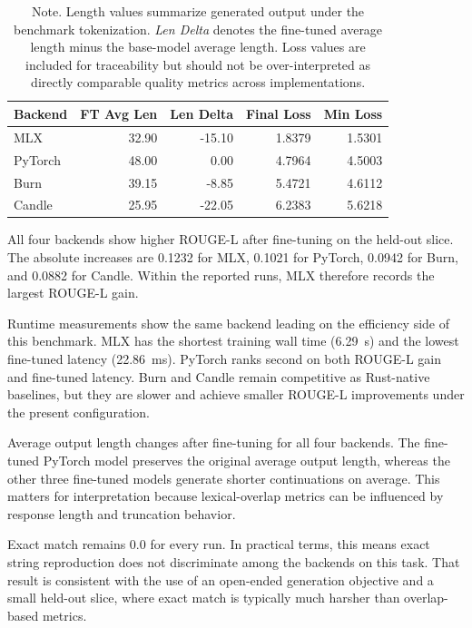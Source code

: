 \documentclass[11pt]{article}
\begin{document}
\begin{table}[t]
\centering
\small
\begin{tabular}{lrrrr}
\toprule
Backend & FT Avg Len & Len Delta & Final Loss & Min Loss \\
\midrule
MLX      & 32.90 & -15.10 & 1.8379 & 1.5301 \\
PyTorch  & 48.00 &   0.00 & 4.7964 & 4.5003 \\
Burn     & 39.15 &  -8.85 & 5.4721 & 4.6112 \\
Candle   & 25.95 & -22.05 & 6.2383 & 5.6218 \\
\bottomrule
\end{tabular}
\caption{Response-length effects and training-loss summaries.}
\label{tab:length-loss}
\caption*{\footnotesize Note. Length values summarize generated output under the benchmark tokenization. \textit{Len Delta} denotes the fine-tuned average length minus the base-model average length. Loss values are included for traceability but should not be over-interpreted as directly comparable quality metrics across implementations.}
\end{table}

All four backends show higher ROUGE-L after fine-tuning on the held-out slice. The absolute increases are 0.1232 for MLX, 0.1021 for PyTorch, 0.0942 for Burn, and 0.0882 for Candle. Within the reported runs, MLX therefore records the largest ROUGE-L gain.

Runtime measurements show the same backend leading on the efficiency side of this benchmark. MLX has the shortest training wall time (6.29~s) and the lowest fine-tuned latency (22.86~ms). PyTorch ranks second on both ROUGE-L gain and fine-tuned latency. Burn and Candle remain competitive as Rust-native baselines, but they are slower and achieve smaller ROUGE-L improvements under the present configuration.

Average output length changes after fine-tuning for all four backends. The fine-tuned PyTorch model preserves the original average output length, whereas the other three fine-tuned models generate shorter continuations on average. This matters for interpretation because lexical-overlap metrics can be influenced by response length and truncation behavior.

Exact match remains 0.0 for every run. In practical terms, this means exact string reproduction does not discriminate among the backends on this task. That result is consistent with the use of an open-ended generation objective and a small held-out slice, where exact match is typically much harsher than overlap-based metrics.
\end{document}
